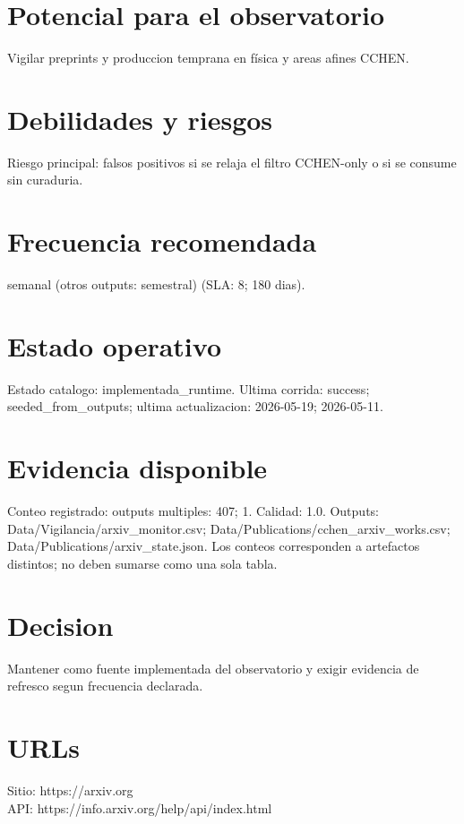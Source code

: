 \documentclass[10pt,a4paper]{article}
\begin{document}
\section*{Potencial para el observatorio}
Vigilar preprints y produccion temprana en física y areas afines CCHEN.

\section*{Debilidades y riesgos}
Riesgo principal: falsos positivos si se relaja el filtro CCHEN-only o si se consume sin curaduria.

\section*{Frecuencia recomendada}
semanal (otros outputs: semestral) (SLA: 8; 180 dias).

\section*{Estado operativo}
Estado catalogo: implementada\_runtime. Ultima corrida: success; seeded\_from\_outputs; ultima actualizacion: 2026-05-19; 2026-05-11.

\section*{Evidencia disponible}
Conteo registrado: outputs multiples: 407; 1. Calidad: 1.0. Outputs: Data/Vigilancia/arxiv\_monitor.csv; Data/Publications/cchen\_arxiv\_works.csv; Data/Publications/arxiv\_state.json. Los conteos corresponden a artefactos distintos; no deben sumarse como una sola tabla.

\section*{Decision}
Mantener como fuente implementada del observatorio y exigir evidencia de refresco segun frecuencia declarada.


\section*{URLs}
Sitio: https://arxiv.org\\
API: https://info.arxiv.org/help/api/index.html
\end{document}

